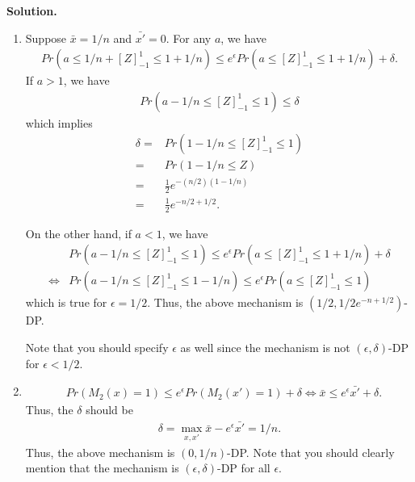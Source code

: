 \documentclass[12pt]{article}
\begin{document}
\begin{enumerate}
\begin{solution}
\textbf{Solution.}\\
\begin{enumerate}
    \item 
    Suppose $\bar{x} = 1/n$ and $\bar{x'}=0$.
    For any $a$, we have 
    \begin{align*}
        Pr(a\leq 1/n+[Z]_{-1}^1\leq 1+1/n) \leq e^\epsilon Pr(a\leq [Z]_{-1}^1\leq 1+1/n) + \delta.
    \end{align*}
    If $a>1$, we have
    \begin{align*}
        Pr(a-1/n\leq [Z]_{-1}^1\leq 1) \leq \delta
    \end{align*}
    which implies
    \begin{align*}
        \delta =& Pr(1-1/n \leq [Z]_{-1}^1 \leq 1)\\
        =& Pr(1-1/n\leq Z)\\
        =& \frac{1}{2} e^{-(n/2)(1-1/n)}\\
        =&\frac{1}{2} e^{-n/2+1/2}.
    \end{align*}

    On the other hand, if $a<1$, we have
    \begin{align*}
        &Pr(a-1/n\leq [Z]_{-1}^1\leq 1) \leq e^\epsilon Pr(a\leq [Z]_{-1}^1\leq 1+1/n) + \delta\\
        \Leftrightarrow &  Pr(a-1/n\leq [Z]_{-1}^1\leq 1-1/n) \leq e^\epsilon Pr(a\leq [Z]_{-1}^1\leq 1) 
    \end{align*}
    which is true for $\epsilon = 1/2$.
    Thus, the above mechanism is $(1/2, 1/2 e^{-n+1/2})$-DP.

    Note that you should specify $\epsilon$ as well since the mechanism is not $(\epsilon, \delta)$-DP for $\epsilon<1/2$.

    \item 
    \begin{align*}
        &Pr(M_2(x) = 1) \leq e^\epsilon Pr(M_2(x')=1)+\delta
        \Leftrightarrow \bar{x} \leq e^\epsilon \bar{x'} + \delta.
    \end{align*}
    Thus, the $\delta$ should be
    \begin{align*}
        \delta = \max_{x, x'} \bar{x} - e^\epsilon \bar{x'} = 1/n.
    \end{align*}
    Thus, the above mechanism is $(0, 1/n)$-DP. 
    Note that you should clearly mention that the mechanism is $(\epsilon, \delta)$-DP for all $\epsilon$.
    \end{enumerate}
\end{solution}


\end{enumerate}
\end{document}
